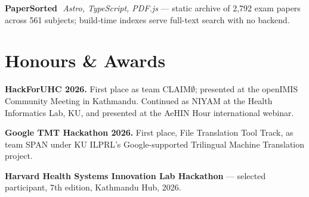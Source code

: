 \documentclass[10pt,letterpaper]{article}
\newcommand{\divider}{\textcolor{accentblue}{\,\textbar\,}}
\begin{document}
\vspace{2.5pt}
\begin{tight}
  \item \textbf{PaperSorted} \divider \textit{Astro, TypeScript, PDF.js} --- static archive of 2,792 exam papers across 561 subjects; build-time indexes serve full-text search with no backend.
\end{tight}

\section{Honours \& Awards}
\begin{tight}
  \item \textbf{HackForUHC 2026.} First place as team CLAIM$\emptyset$; presented at the openIMIS Community Meeting in Kathmandu. Continued as NIYAM at the Health Informatics Lab, KU, and presented at the AeHIN Hour international webinar.
  \item \textbf{Google TMT Hackathon 2026.} First place, File Translation Tool Track, as team SPAN under KU ILPRL's Google-supported Trilingual Machine Translation project.
  \item \textbf{Harvard Health Systems Innovation Lab Hackathon} --- selected participant, 7th edition, Kathmandu Hub, 2026.
\end{tight}
\end{document}
